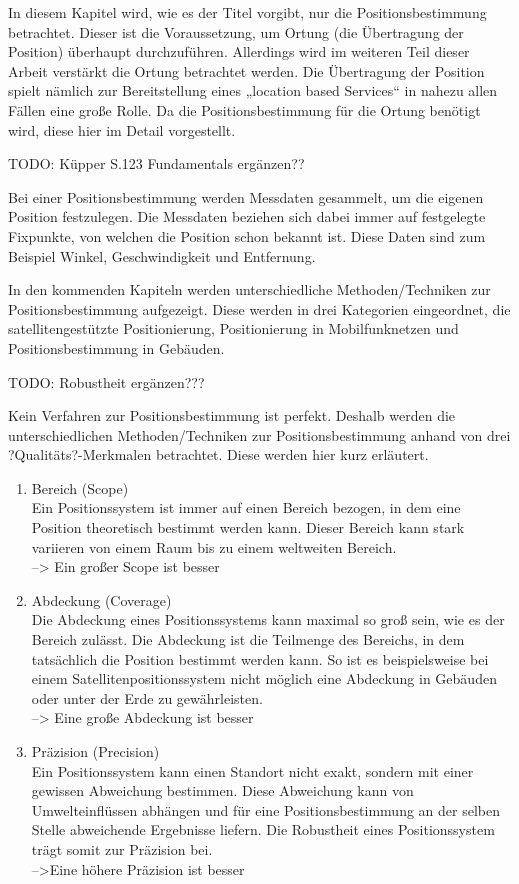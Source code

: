 In diesem Kapitel wird, wie es der Titel vorgibt, nur die Positionsbestimmung betrachtet. Dieser ist die Voraussetzung, um Ortung (die Übertragung der Position) überhaupt durchzuführen. Allerdings wird im weiteren Teil dieser Arbeit verstärkt die Ortung betrachtet werden. Die Übertragung der Position spielt nämlich zur Bereitstellung eines „location based Services“ in nahezu allen Fällen eine große Rolle. Da die Positionsbestimmung für die Ortung benötigt wird, diese hier im Detail vorgestellt.

TODO: Küpper S.123
Fundamentals ergänzen??

Bei einer Positionsbestimmung werden Messdaten gesammelt, um die eigenen Position festzulegen. Die Messdaten beziehen sich dabei immer auf festgelegte Fixpunkte, von welchen die Position schon bekannt ist.  Diese Daten sind zum Beispiel Winkel, Geschwindigkeit und Entfernung.

In den kommenden Kapiteln werden unterschiedliche Methoden/Techniken zur Positionsbestimmung aufgezeigt. Diese werden in drei Kategorien eingeordnet, die satellitengestützte Positionierung, Positionierung in Mobilfunknetzen und Positionsbestimmung in Gebäuden.

TODO: Robustheit ergänzen???

Kein Verfahren zur Positionsbestimmung ist perfekt. 
Deshalb werden die unterschiedlichen Methoden/Techniken zur Positionsbestimmung anhand von drei ?Qualitäts?-Merkmalen betrachtet. Diese werden hier kurz erläutert.

\begin{enumerate}
\item Bereich (Scope)\\
Ein Positionssystem ist immer auf einen Bereich bezogen, in dem eine Position theoretisch bestimmt werden kann. Dieser Bereich kann stark variieren von einem Raum bis zu einem weltweiten Bereich.\\
--> Ein großer Scope ist besser
\item Abdeckung (Coverage)\\
Die Abdeckung eines Positionssystems kann maximal so groß sein, wie es der Bereich zulässt. Die Abdeckung ist die Teilmenge des Bereichs, in dem tatsächlich die Position bestimmt werden kann. So ist es beispielsweise bei einem Satellitenpositionssystem nicht möglich eine Abdeckung in Gebäuden oder unter der Erde zu gewährleisten.\\
--> Eine große Abdeckung ist besser
\item Präzision (Precision)\\
Ein Positionssystem kann einen Standort nicht exakt, sondern mit einer gewissen Abweichung bestimmen. Diese Abweichung kann von Umwelteinflüssen abhängen und für eine Positionsbestimmung an der selben Stelle abweichende Ergebnisse liefern. Die Robustheit eines Positionssystem trägt somit zur Präzision bei. \\
-->Eine höhere Präzision ist besser
\end{enumerate}
\cite[S.183]{Schiller2004}


